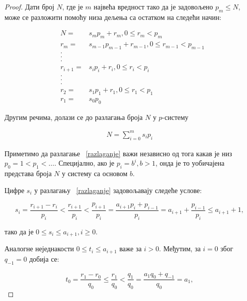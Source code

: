\documentclass[a4paper]{article}
\begin{document}
\begin{proof}
	Дати број $ N $, где је $ m $ највећа вредност тако да је задовољено $ p_{m} \leq N $, може се разложити помоћу низа дељења са остатком на следећи начин:
	
	\begin{eqnarray*}
		&N = &s_{m}p_{m} + r_{m}, 0 \leq r_{m} < p_{m}\\
		&r_{m} = &s_{m-1}p_{m-1} + r_{m-1}, 0 \leq r_{m-1} < p_{m-1}\\
		& . \\
		& . \\
		& . \\
		&r_{i+1} = &s_{i}p_{i} + r_{i}, 0 \leq r_{i} < p_{i}\\
		& . \\
		& . \\
		& . \\
		&r_{2} =& s_{1}p_{1} + r_{1}, 0 \leq r_{1} < p_{1}\\
		&r_{1} =& s_{0}p_{0} 
	\end{eqnarray*}
	
	Другим речима, долази се до разлагања броја $ N $ у $ p $-систему 
	
		 \begin{eqnarray}
			 \label{razlaganje} N = \sum_{i=0}^{m} s_{i}p_{i} 
		 \end{eqnarray}
	
	Приметимо да разлагање ~\eqref{razlaganje} важи независно од тога какав је низ $ p_{0} = 1 < p_{1} < \ldots $. Специјално, ако је $ p_{i} = b^{i}, b > 1 $, онда је то уобичајена представа броја $ N $ у систему са основом $ b $.
	
	Цифре $ s_i $ у разлагању ~\eqref{razlaganje} задовољавају следеће услове:
	
	\begin{displaymath}
		s_{i} = \frac{r_{i+1} - r_{i}}{p_{i}} < \frac{r_{i+1}}{p_{i}} < \frac{p_{i+1}}{p_{i}} = \frac{a_{i+1}p_{i}+p_{i-1}}{p_{i}} = a_{i+1} + \frac{p_{i-1}}{p_{i}} \leq a_{i+1} + 1, 
	\end{displaymath} 
	 
	тако да је $ 0 \leq s_{i} \leq a_{i+1}, i \geq 0 $.
	
	
	Аналогне неједнакости $ 0 \le t_{i} \le a_{i+1} $ важе за $ i > 0 $. Међутим, за $ i = 0 $ због $ q_{-1} = 0 $ добија се:
	
	\begin{displaymath} 
		t_0=\frac{r_1-r_0}{q_0}\le \frac{r_1}{q_0} < \frac{q_1}{q_0}=
		\frac{a_1 q_0+q_{-1}}{q_0}=a_1,
	\end{displaymath}
	

\end{proof}
\end{document}
